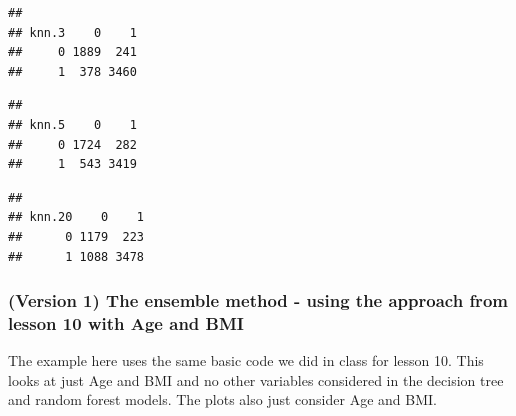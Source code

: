 \documentclass[]{article}
\newenvironment{Shaded}{\begin{snugshade}}{\end{snugshade}}
\newcommand{\KeywordTok}[1]{\textcolor[rgb]{0.13,0.29,0.53}{\textbf{{#1}}}}
\newcommand{\FloatTok}[1]{\textcolor[rgb]{0.00,0.00,0.81}{{#1}}}
\newcommand{\NormalTok}[1]{{#1}}
\begin{document}
\begin{Shaded}
\end{Shaded}

\begin{verbatim}
##      
## knn.3    0    1
##     0 1889  241
##     1  378 3460
\end{verbatim}

\begin{Shaded}
\end{Shaded}

\begin{verbatim}
##      
## knn.5    0    1
##     0 1724  282
##     1  543 3419
\end{verbatim}

\begin{Shaded}
\end{Shaded}

\begin{verbatim}
##       
## knn.20    0    1
##      0 1179  223
##      1 1088 3478
\end{verbatim}

\subsubsection{(Version 1) The ensemble method - using the approach from
lesson 10 with Age and
BMI}\label{version-1-the-ensemble-method---using-the-approach-from-lesson-10-with-age-and-bmi-1}

The example here uses the same basic code we did in class for lesson 10.
This looks at just Age and BMI and no other variables considered in the
decision tree and random forest models. The plots also just consider Age
and BMI.
\end{document}
